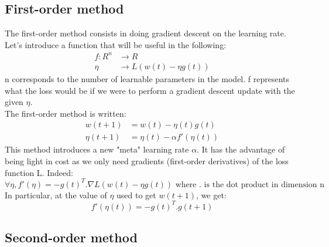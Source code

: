 \documentclass{article}
\begin{document}
  \subsection{First-order method}
  
  The first-order method consists in doing gradient descent on the learning rate. Let's introduce a function that will be useful in the following:\\
  \begin{align}
  f : R^{n} &\rightarrow R\\
  \eta &\rightarrow L(w(t)-\eta g(t))
  \end{align}
  n corresponds to the number of learnable parameters in the model. f represents what the loss would be if we were to perform a gradient descent update with the given $\eta$.\\
  The first-order method is written:\\
  \begin{align}
  w(t+1) &= w(t) -\eta(t)g(t)\\
  \eta(t+1) &= \eta(t) - \alpha f'(\eta(t))
  \end{align} 
  This method introduces a new "meta" learning rate $\alpha$. It has the advantage of being light in cost as we only need gradients (first-order derivatives) of the loss function L. Indeed:\\
  \begin{equation}
  \forall \eta, f'(\eta) = -g(t)^{T}.\nabla L(w(t)-\eta g(t)) \text{ where . is the dot product in dimension n}
  \end{equation}
  In particular, at the value of $\eta$ used to get $w(t+1)$, we get:\\
  \begin{equation}
  f'(\eta(t)) = -g(t)^{T}.g(t+1)
  \end{equation}
  
  \subsection{Second-order method}
  
\end{document}
